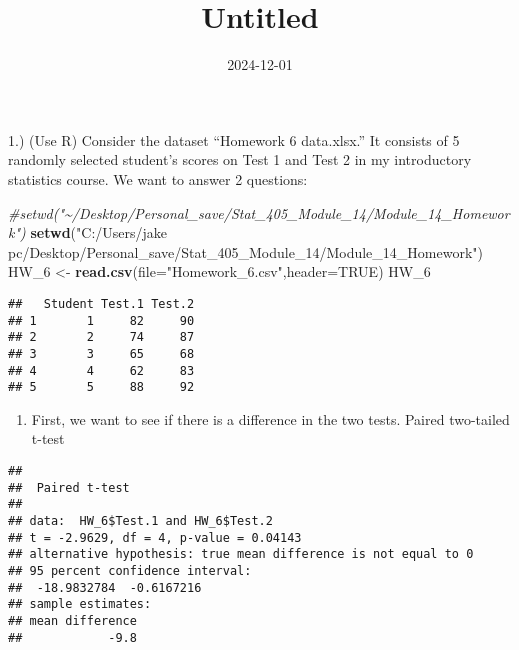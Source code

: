 \documentclass[
]{article}
\title{Untitled}
\author{}
\date{\vspace{-2.5em}2024-12-01}
\newenvironment{Shaded}{\begin{snugshade}}{\end{snugshade}}
\newcommand{\AttributeTok}[1]{\textcolor[rgb]{0.13,0.29,0.53}{#1}}
\newcommand{\CommentTok}[1]{\textcolor[rgb]{0.56,0.35,0.01}{\textit{#1}}}
\newcommand{\ConstantTok}[1]{\textcolor[rgb]{0.56,0.35,0.01}{#1}}
\newcommand{\FloatTok}[1]{\textcolor[rgb]{0.00,0.00,0.81}{#1}}
\newcommand{\FunctionTok}[1]{\textcolor[rgb]{0.13,0.29,0.53}{\textbf{#1}}}
\newcommand{\NormalTok}[1]{#1}
\newcommand{\OtherTok}[1]{\textcolor[rgb]{0.56,0.35,0.01}{#1}}
\newcommand{\SpecialCharTok}[1]{\textcolor[rgb]{0.81,0.36,0.00}{\textbf{#1}}}
\newcommand{\StringTok}[1]{\textcolor[rgb]{0.31,0.60,0.02}{#1}}
\providecommand{\tightlist}{%
  \setlength{\itemsep}{0pt}\setlength{\parskip}{0pt}}
\begin{document}
\maketitle

1.) (Use R) Consider the dataset ``Homework 6 data.xlsx.'' It consists
of 5 randomly selected student's scores on Test 1 and Test 2 in my
introductory statistics course. We want to answer 2 questions:

\begin{Shaded}
\begin{Highlighting}[]
\CommentTok{\#setwd("\textasciitilde{}/Desktop/Personal\_save/Stat\_405\_Module\_14/Module\_14\_Homework")}
\FunctionTok{setwd}\NormalTok{(}\StringTok{"C:/Users/jake pc/Desktop/Personal\_save/Stat\_405\_Module\_14/Module\_14\_Homework"}\NormalTok{)}
\NormalTok{HW\_6 }\OtherTok{\textless{}{-}} \FunctionTok{read.csv}\NormalTok{(}\AttributeTok{file=}\StringTok{"Homework\_6.csv"}\NormalTok{,}\AttributeTok{header=}\ConstantTok{TRUE}\NormalTok{)}
\NormalTok{HW\_6}
\end{Highlighting}
\end{Shaded}

\begin{verbatim}
##   Student Test.1 Test.2
## 1       1     82     90
## 2       2     74     87
## 3       3     65     68
## 4       4     62     83
## 5       5     88     92
\end{verbatim}

\begin{enumerate}
\def\labelenumi{\alph{enumi}.}
\tightlist
\item
  First, we want to see if there is a difference in the two tests.
  Paired two-tailed t-test
\end{enumerate}

\begin{Shaded}
\end{Shaded}

\begin{verbatim}
## 
##  Paired t-test
## 
## data:  HW_6$Test.1 and HW_6$Test.2
## t = -2.9629, df = 4, p-value = 0.04143
## alternative hypothesis: true mean difference is not equal to 0
## 95 percent confidence interval:
##  -18.9832784  -0.6167216
## sample estimates:
## mean difference 
##            -9.8
\end{verbatim}
\end{document}
